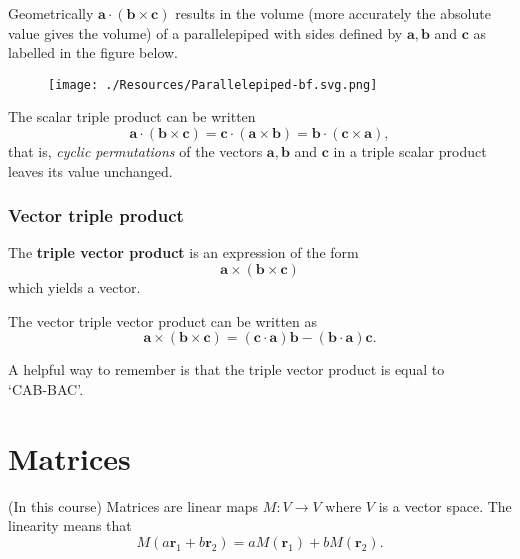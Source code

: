 \documentclass[12pt, a4paper]{article}
\begin{document}
\begin{theorem}
    Geometrically \(\bm{a} \cdot (\bm{b} \times\bm{c})\) results in the volume (more accurately the absolute value gives the volume) of a parallelepiped with sides defined by \(\bm{a},\bm{b}\) and \(\bm{c}\) as labelled in the figure below.

    \begin{figure}[H]
        \begin{center}
            \texttt{[image: ./Resources/Parallelepiped-bf.svg.png]}
        \end{center}
    \end{figure}

\end{theorem}

\begin{mdthm}
    The scalar triple product can be written 
    \[\bm{a}\cdot (\bm{b} \times \bm{c}) = \bm{c} \cdot (\bm{a} \times \bm{b}) = \bm{b} \cdot (\bm{c}\times \bm{a}),\]
    that is, \textit{cyclic permutations} of the vectors \(\bm{a},\bm{b}\) and \(\bm{c}\) in a triple scalar product leaves its value unchanged.
\end{mdthm}

\subsubsection{Vector triple product}

\begin{definition}
    The \textbf{triple vector product} is an expression of the form 
    \[\bm{a} \times (\bm{b} \times \bm{c})\]
    which yields a vector.
\end{definition}

\begin{mdthm}
    The vector triple vector product can be written as 
    \[\bm{a} \times (\bm{b} \times \bm{c}) = (\bm{c} \cdot \bm{a}) \bm{b}- (\bm{b} \cdot \bm{a}) \bm{c}.\]
\end{mdthm}

\begin{mdnote}
    A helpful way to remember is that the triple vector product is equal to \\ `CAB-BAC'.
\end{mdnote}

\section{Matrices}

\begin{definition}
    (In this course) Matrices are linear maps \(M:V\to V\) where \(V\) is a vector space. The linearity means that 
    \[M(a\bm{r}_1+b\bm{r}_2)=aM(\bm{r}_1)+bM(\bm{r}_2).\] 
\end{definition}
\end{document}

